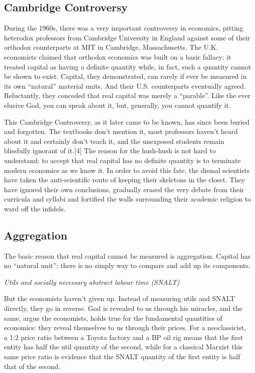 \documentclass[
]{book}
\begin{document}
\hypertarget{cambridge-controversy}{%
\subsection{Cambridge Controversy}\label{cambridge-controversy}}

During the 1960s, there was a very important controversy in economics, pitting heterodox professors from Cambridge University in England against some of their orthodox counterparts at MIT in Cambridge, Massachusetts. The U.K. economists claimed that orthodox economics was built on a basic fallacy: it treated capital as having a definite quantity while, in fact, such a quantity cannot be shown to exist. Capital, they demonstrated, can rarely if ever be measured in its own ``natural'' material units. And their U.S. counterparts eventually agreed. Reluctantly, they conceded that real capital was merely a ``parable''. Like the ever elusive God, you can speak about it, but, generally, you cannot quantify it.

This Cambridge Controversy, as it later came to be known, has since been buried and forgotten. The textbooks don't mention it, most professors haven't heard about it and certainly don't teach it, and the unexposed students remain blissfully ignorant of it.{[}4{]} The reason for the hush-hush is not hard to understand: to accept that real capital has no definite quantity is to terminate modern economics as we know it. In order to avoid this fate, the dismal scientists have taken the anti-scientific route of keeping their skeletons in the closet. They have ignored their own conclusions, gradually erased the very debate from their curricula and syllabi and fortified the walls surrounding their academic religion to ward off the infidels.

\hypertarget{aggregation}{%
\subsection{Aggregation}\label{aggregation}}

The basic reason that real capital cannot be measured is aggregation.
Capital has no ``natural unit'': there is no simply way to compare and add up its components.

\emph{Utils and socially necessary abstract labour time (SNALT)}

But the economists haven't given up. Instead of measuring utils and SNALT directly, they go in reverse. God is revealed to us through his miracles, and the same, argue the economists, holds true for the fundamental quantities of economics: they reveal themselves to us through their prices. For a neoclassicist, a 1:2 price ratio between a Toyota factory and a BP oil rig means that the first entity has half the util quantity of the second, while for a classical Marxist this same price ratio is evidence that the SNALT quantity of the first entity is half that of the second.
\end{document}
